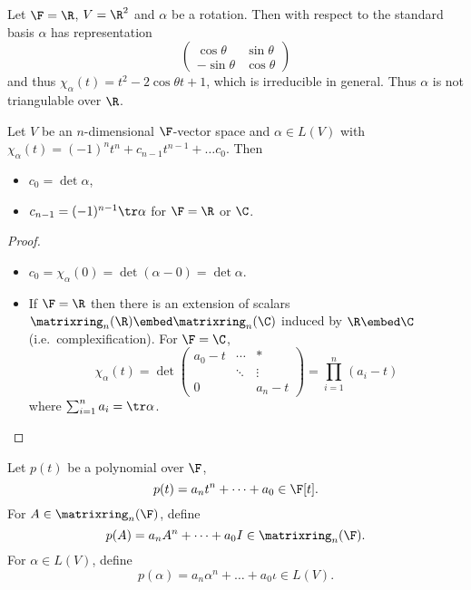 \documentclass[a4paper]{article}
\newcommand*{\M}{\matrixring}
\theoremstyle{definition}
\begin{document}
\begin{eg}
  Let \(\F = \R\), \(V = \R^2\) and \(\alpha\) be a rotation. Then with respect to the standard basis \(\alpha\) has representation
  \[
    \begin{pmatrix}
      \cos \theta & \sin \theta \\
      -\sin \theta & \cos \theta
    \end{pmatrix}
  \]
  and thus \(\chi_\alpha(t) = t^2 - 2 \cos \theta t + 1\), which is irreducible in general. Thus \(\alpha\) is not triangulable over \(\R\).
\end{eg}

\begin{lemma}
  Let \(V\) be an \(n\)-dimensional \(\F\)-vector space and \(\alpha \in L(V)\) with \(\chi_\alpha(t) = (-1)^n t^n + c_{n - 1} t^{n - 1} + \dots c_0\). Then
  \begin{itemize}
  \item \(c_0 = \det \alpha\),
  \item \(c_{n - 1} = (-1)^{n - 1} \tr \alpha\) for \(\F = \R\) or \(\C\).
  \end{itemize}
\end{lemma}

\begin{proof}\leavevmode
  \begin{itemize}
  \item \(c_0 = \chi_\alpha(0) = \det (\alpha - 0) = \det \alpha\).
  \item If \(\F = \R\) then there is an extension of scalars \(\M_n(\R) \embed \M_n(\C)\) induced by \(\R \embed \C\) (i.e.\ complexification). For \(\F = \C\),
    \[
      \chi_\alpha(t) = \det
      \begin{pmatrix}
        a_0 - t & \cdots & * \\
        & \ddots & \vdots \\
        0 & & a_n - t
      \end{pmatrix}
      = \prod_{i = 1}^{n} (a_i - t)
    \]
    where \(\sum_{i = 1}^n a_i = \tr \alpha\).
  \end{itemize}
\end{proof}

\begin{notation}
  Let \(p(t)\) be a polynomial over \(\F\),
  \[
    p(t) = a_nt^n + \dots + a_0 \in \F[t].
  \]
  For \(A \in \M_n(\F)\), define
  \[
    p(A) = a_nA^n + \dots + a_0I \in \M_n(\F).
  \]
  For \(\alpha \in L(V)\), define
  \[
    p(\alpha) = a_n\alpha^n + \dots + a_0\iota \in L(V).
  \]
\end{notation}
\end{document}
